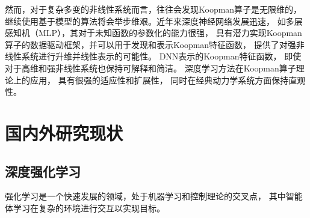 \documentclass[AutoFakeBold]{LZUThesis}
\begin{document}
然而，对于复杂多变的非线性系统而言，往往会发现Koopman算子是无限维的，
继续使用基于模型的算法将会举步维艰。近年来深度神经网络发展迅速，
如多层感知机（MLP），其对于未知函数的参数化的能力很强，
具有潜力实现Koopman算子的数据驱动框架，并可以用于发现和表示Koopman特征函数，
提供了对强非线性系统进行升维并线性表示的可能性。
DNN表示的Koopman特征函数，
即使对于高维和强非线性系统也保持可解释和简洁。
深度学习方法在Koopman算子理论上的应用，
具有很强的适应性和扩展性，
同时在经典动力学系统方面保持直观性。






%
%
%
%



\section{国内外研究现状}

\subsection{深度强化学习}
强化学习是一个快速发展的领域，处于机器学习和控制理论的交叉点，
其中智能体学习在复杂的环境进行交互以实现目标\cite{Brunton_book_2019}。
\end{document}

